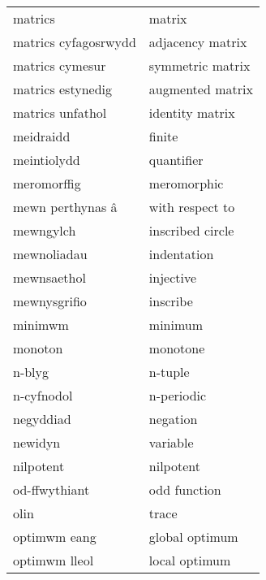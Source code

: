 \begin{supertabular}{p{0.22\textwidth}p{0.22\textwidth}}
                        matrics &                           matrix \\
           matrics cyfagosrwydd &                 adjacency matrix \\
                matrics cymesur &                 symmetric matrix \\
              matrics estynedig &                 augmented matrix \\
               matrics unfathol &                  identity matrix \\
                      meidraidd &                           finite \\
                    meintiolydd &                       quantifier \\
                    meromorffig &                      meromorphic \\
               mewn perthynas â &                  with respect to \\
                      mewngylch &                 inscribed circle \\
                    mewnoliadau &                      indentation \\
                    mewnsaethol &                        injective \\
                   mewnysgrifio &                         inscribe \\
                        minimwm &                          minimum \\
                        monoton &                         monotone \\
                         n-blyg &                          n-tuple \\
                     n-cyfnodol &                       n-periodic \\
                      negyddiad &                         negation \\
                        newidyn &                         variable \\
                      nilpotent &                        nilpotent \\
                  od-ffwythiant &                     odd function \\
                           olin &                            trace \\
                   optimwm eang &                   global optimum \\
                  optimwm lleol &                    local optimum \\

\end{supertabular}
